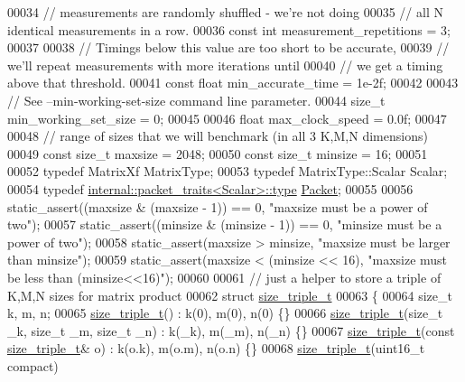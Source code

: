 \begin{DoxyCode}
00034 \textcolor{comment}{// measurements are randomly shuffled - we're not doing}
00035 \textcolor{comment}{// all N identical measurements in a row.}
00036 \textcolor{keyword}{const} \textcolor{keywordtype}{int} measurement\_repetitions = 3;
00037 
00038 \textcolor{comment}{// Timings below this value are too short to be accurate,}
00039 \textcolor{comment}{// we'll repeat measurements with more iterations until}
00040 \textcolor{comment}{// we get a timing above that threshold.}
00041 \textcolor{keyword}{const} \textcolor{keywordtype}{float} min\_accurate\_time = 1e-2f;
00042 
00043 \textcolor{comment}{// See --min-working-set-size command line parameter.}
00044 \textcolor{keywordtype}{size\_t} min\_working\_set\_size = 0;
00045 
00046 \textcolor{keywordtype}{float} max\_clock\_speed = 0.0f;
00047 
00048 \textcolor{comment}{// range of sizes that we will benchmark (in all 3 K,M,N dimensions)}
00049 \textcolor{keyword}{const} \textcolor{keywordtype}{size\_t} maxsize = 2048;
00050 \textcolor{keyword}{const} \textcolor{keywordtype}{size\_t} minsize = 16;
00051 
00052 \textcolor{keyword}{typedef} MatrixXf MatrixType;
00053 \textcolor{keyword}{typedef} MatrixType::Scalar Scalar;
00054 \textcolor{keyword}{typedef} \hyperlink{group___sparse_core___module}{internal::packet\_traits<Scalar>::type} 
      \hyperlink{group___sparse_core___module}{Packet};
00055 
00056 static\_assert((maxsize & (maxsize - 1)) == 0, \textcolor{stringliteral}{"maxsize must be a power of two"});
00057 static\_assert((minsize & (minsize - 1)) == 0, \textcolor{stringliteral}{"minsize must be a power of two"});
00058 static\_assert(maxsize > minsize, \textcolor{stringliteral}{"maxsize must be larger than minsize"});
00059 static\_assert(maxsize < (minsize << 16), \textcolor{stringliteral}{"maxsize must be less than (minsize<<16)"});
00060 
00061 \textcolor{comment}{// just a helper to store a triple of K,M,N sizes for matrix product}
00062 \textcolor{keyword}{struct }\hyperlink{structsize__triple__t}{size\_triple\_t}
00063 \{
00064   \textcolor{keywordtype}{size\_t} k, m, n;
00065   \hyperlink{structsize__triple__t}{size\_triple\_t}() : k(0), m(0), n(0) \{\}
00066   \hyperlink{structsize__triple__t}{size\_triple\_t}(\textcolor{keywordtype}{size\_t} \_k, \textcolor{keywordtype}{size\_t} \_m, \textcolor{keywordtype}{size\_t} \_n) : k(\_k), m(\_m), n(\_n) \{\}
00067   \hyperlink{structsize__triple__t}{size\_triple\_t}(\textcolor{keyword}{const} \hyperlink{structsize__triple__t}{size\_triple\_t}& o) : k(o.k), m(o.m), n(o.n) \{\}
00068   \hyperlink{structsize__triple__t}{size\_triple\_t}(uint16\_t compact)

\end{DoxyCode}
